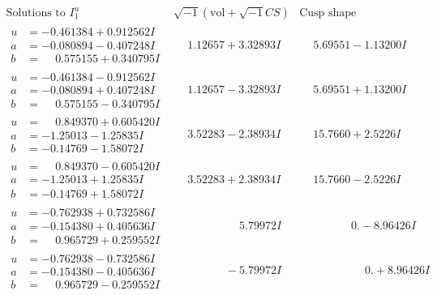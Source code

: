 \documentclass[1p]{elsarticle_modified}
\theoremstyle{definition}
\newcommand{\I}{\sqrt{-1}}
\begin{document}
$$\begin{array}{c|c|c}  
\text{Solutions to }I^u_{1}& \I (\text{vol} + \sqrt{-1}CS) & \text{Cusp shape}\\
 \hline 
\begin{aligned}
u &= -0.461384 + 0.912562 I \\
a &= -0.080894 - 0.407248 I \\
b &= \phantom{-}0.575155 + 0.340795 I\end{aligned}
 & \phantom{-}1.12657 + 3.32893 I & \phantom{-}5.69551 - 1.13200 I \\ \hline\begin{aligned}
u &= -0.461384 - 0.912562 I \\
a &= -0.080894 + 0.407248 I \\
b &= \phantom{-}0.575155 - 0.340795 I\end{aligned}
 & \phantom{-}1.12657 - 3.32893 I & \phantom{-}5.69551 + 1.13200 I \\ \hline\begin{aligned}
u &= \phantom{-}0.849370 + 0.605420 I \\
a &= -1.25013 - 1.25835 I \\
b &= -0.14769 - 1.58072 I\end{aligned}
 & \phantom{-}3.52283 - 2.38934 I & \phantom{-}15.7660 + 2.5226 I \\ \hline\begin{aligned}
u &= \phantom{-}0.849370 - 0.605420 I \\
a &= -1.25013 + 1.25835 I \\
b &= -0.14769 + 1.58072 I\end{aligned}
 & \phantom{-}3.52283 + 2.38934 I & \phantom{-}15.7660 - 2.5226 I \\ \hline\begin{aligned}
u &= -0.762938 + 0.732586 I \\
a &= -0.154380 + 0.405636 I \\
b &= \phantom{-}0.965729 + 0.259552 I\end{aligned}
 & \phantom{-0.000000 -}5.79972 I & \phantom{-0.000000 } 0. - 8.96426 I \\ \hline\begin{aligned}
u &= -0.762938 - 0.732586 I \\
a &= -0.154380 - 0.405636 I \\
b &= \phantom{-}0.965729 - 0.259552 I\end{aligned}
 & \phantom{-0.000000 } -5.79972 I & \phantom{-0.000000 -}0. + 8.96426 I \\ \hline\begin{aligned}

\end{aligned}
\end{array}$$
\end{document}
